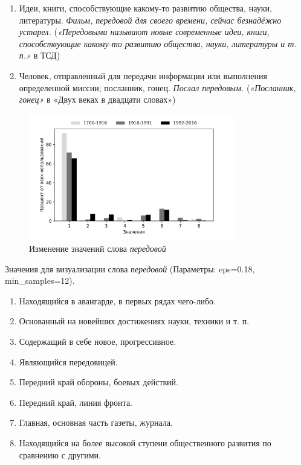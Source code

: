 \begin{enumerate}
    \item Идеи, книги, способствующие какому-то развитию общества, науки, литературы. \textit{Фильм, передовой для своего времени, сейчас безнадёжно устарел.}
(\textit{«Передовыми называют новые современные идеи, книги, способствующие какому-то развитию общества, науки, литературы и т. п.»} в ТСД)

    \item Человек, отправленный для передачи информации или выполнения определенной миссии; посланник, гонец. \textit{Послал передовым.}
(\textit{«Посланник, гонец»} в «Двух веках в двадцати словах»)
\end{enumerate}

\begin{figure}[H]
	\centering
	\includegraphics[width=0.8\textwidth]{img/visualizations/peredovoj_minimal}
	\caption{Изменение значений слова \textit{передовой}}
	\label{fig:Передовой}
\end{figure}

Значения для визуализации слова \textit{передовой} (Параметры: eps=0.18, min\_samples=12).

\begin{enumerate}
    \item Находящийся в авангарде, в первых рядах чего-либо.
    \item Основанный на новейших достижениях науки, техники и т. п.
    \item Содержащий в себе новое, прогрессивное.
    \item Являющийся передовицей.
    \item Передний край обороны, боевых действий.
    \item Передний край, линия фронта.
    \item Главная, основная часть газеты, журнала.
    \item Находящийся на более высокой ступени общественного развития по сравнению с другими.
\end{enumerate}

